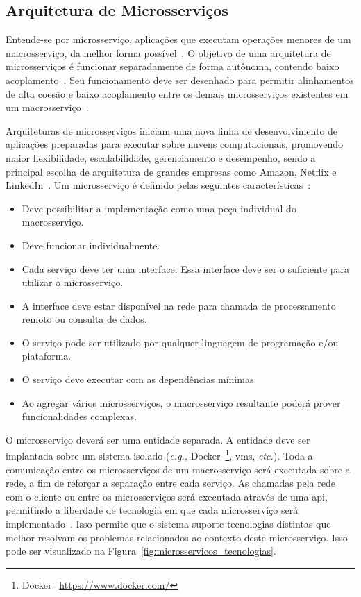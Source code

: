 \subsection{Arquitetura de Microsserviços}
\label{sec:microsservicos}



Entende-se por microsserviço, aplicações que executam operações menores de um macrosserviço, da melhor forma possível~\cite{stephenclarkewillson2017, Newman2015Feb}.
%
O objetivo de uma arquitetura de microsserviços é funcionar separadamente de forma autônoma, contendo baixo acoplamento~\cite{Newman2015Feb}.
%
Seu funcionamento deve ser desenhado para permitir alinhamentos de alta coesão e baixo acoplamento entre os demais microsserviços existentes em um macrosserviço~\cite{8169955}.



Arquiteturas de microsserviços iniciam uma nova linha de desenvolvimento de aplicações preparadas para executar sobre nuvens computacionais, promovendo maior flexibilidade, escalabilidade, gerenciamento e desempenho, sendo a principal escolha de arquitetura de grandes empresas como Amazon, Netflix e LinkedIn~\cite{7830692,7515686}.
%
Um microsserviço é definido pelas seguintes características~\cite{8169955}:



\begin{itemize}
  \item Deve possibilitar a implementação como uma peça individual do macrosserviço.
  \item Deve funcionar individualmente.
  \item Cada serviço deve ter uma interface. Essa interface deve ser o suficiente para utilizar o microsserviço.
  \item A interface deve estar disponível na rede para chamada de processamento remoto ou consulta de dados.
  \item O serviço pode ser utilizado por qualquer linguagem de programação e/ou plataforma.
  \item O serviço deve executar com as dependências mínimas.
  \item Ao agregar vários microsserviços, o macrosserviço resultante poderá prover funcionalidades complexas.
\end{itemize}



O microsserviço deverá ser uma entidade separada.
%
A entidade deve ser implantada sobre um sistema isolado (\textit{e.g.,} Docker~\footnote{Docker:~\url{https://www.docker.com/}}, \acp{vm}, \textit{etc.}).
%
Toda a comunicação entre os microsserviços de um macrosserviço será executada sobre a rede, a fim de reforçar a separação entre cada serviço.
%
As chamadas pela rede com o cliente ou entre os microsserviços será executada através de uma \ac{api}, permitindo a liberdade de tecnologia em que cada microsserviço será implementado~\cite{Newman2015Feb}.
%
Isso permite que o sistema suporte tecnologias distintas que melhor resolvam os problemas relacionados ao contexto deste microsserviço.
%
Isso pode ser visualizado na Figura~\ref{fig:microsservicos_tecnologias}.




